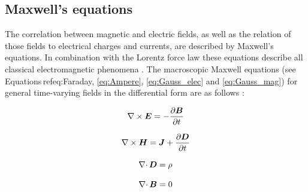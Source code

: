 \subsection{Maxwell's equations}
\label{subsec:Maxwell}
The correlation between magnetic and electric fields, as well as the relation of those fields to electrical charges and currents, are described by  Maxwell’s equations. In combination with the Lorentz force law these equations describe all classical electromagnetic phenomena \cite{meschede2015gerthsen}. The macroscopic Maxwell equations (see Equations\,ref{eq:Faraday}, \ref{eq:Ampere}, \ref{eq:Gauss_elec} and \ref{eq:Gauss_mag}) for general time-varying fields in the differential form are as follows \cite{monk2003finite}: 

\begin{equation}
\label{eq:Faraday}
\centering
\nabla\times\boldsymbol{E} = -\frac{\partial\boldsymbol{B}}{\partial t}
\end{equation}

\begin{equation}
\label{eq:Ampere}
\centering
\nabla\times\boldsymbol{H} = \boldsymbol{J} + \frac{\partial\boldsymbol{D}}{\partial t}
\end{equation}

\begin{equation}
\label{eq:Gauss_elec}
\centering
\nabla\cdotp\boldsymbol{D} = \rho 
\end{equation}

\begin{equation}
\label{eq:Gauss_mag}
\centering
\nabla\cdotp\boldsymbol{B} = 0
\end{equation}

